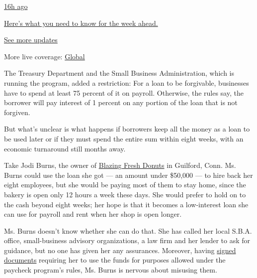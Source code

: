 \href{https://www.nytimes3xbfgragh.onion/live/2020/08/17/business/stock-market-today-coronavirus?action=click\&pgtype=Article\&state=default\&region=MAIN_CONTENT_1\&context=storylines_live_updates\#heres-what-you-need-to-know-for-the-week-ahead}{16h
ago}

\href{https://www.nytimes3xbfgragh.onion/live/2020/08/17/business/stock-market-today-coronavirus?action=click\&pgtype=Article\&state=default\&region=MAIN_CONTENT_1\&context=storylines_live_updates\#heres-what-you-need-to-know-for-the-week-ahead}{Here's
what you need to know for the week ahead.}

\href{https://www.nytimes3xbfgragh.onion/live/2020/08/17/business/stock-market-today-coronavirus?action=click\&pgtype=Article\&state=default\&region=MAIN_CONTENT_1\&context=storylines_live_updates}{See
more updates}

More live coverage:
\href{https://www.nytimes3xbfgragh.onion/2020/08/17/world/coronavirus-covid.html?action=click\&pgtype=Article\&state=default\&region=MAIN_CONTENT_1\&context=storylines_live_updates}{Global}

The Treasury Department and the Small Business Administration, which is
running the program, added a restriction: For a loan to be forgivable,
businesses have to spend at least 75 percent of it on payroll.
Otherwise, the rules say, the borrower will pay interest of 1 percent on
any portion of the loan that is not forgiven.

But what's unclear is what happens if borrowers keep all the money as a
loan to be used later or if they must spend the entire sum within eight
weeks, with an economic turnaround still months away.

Take Jodi Burns, the owner of
\href{https://www.blazingfreshdonuts.com/}{Blazing Fresh Donuts} in
Guilford, Conn. Ms. Burns could use the loan she got --- an amount under
\$50,000 --- to hire back her eight employees, but she would be paying
most of them to stay home, since the bakery is open only 12 hours a week
these days. She would prefer to hold on to the cash beyond eight weeks;
her hope is that it becomes a low-interest loan she can use for payroll
and rent when her shop is open longer.

Ms. Burns doesn't know whether she can do that. She has called her local
S.B.A. office, small-business advisory organizations, a law firm and her
lender to ask for guidance, but no one has given her any assurances.
Moreover, having
\href{https://home.treasury.gov/system/files/136/PPP-Borrower-Application-Form-Fillable.pdf}{signed
documents} requiring her to use the funds for purposes allowed under the
paycheck program's rules, Ms. Burns is nervous about misusing them.

